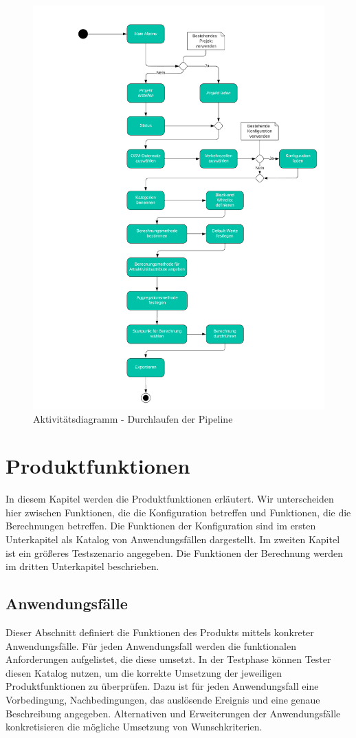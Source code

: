 \documentclass[parskip=full]{scrartcl} %
\begin{document}
\begin{figure}
    \centering
    \includegraphics[width=.9\textwidth,cfbox=black 1pt 0pt]{pictures/Aktivitaetsdiagramm.png}
    \caption{Aktivitätsdiagramm - Durchlaufen der Pipeline}
\end{figure}


\section{Produktfunktionen}
In diesem Kapitel werden die Produktfunktionen erläutert. Wir unterscheiden hier zwischen Funktionen, die die Konfiguration betreffen und Funktionen, die die Berechnungen betreffen. Die Funktionen der Konfiguration sind im ersten Unterkapitel als Katalog von Anwendungsfällen dargestellt. Im zweiten Kapitel ist ein größeres Testszenario angegeben. Die Funktionen der Berechnung werden im dritten Unterkapitel beschrieben.

\subsection{Anwendungsfälle}
Dieser Abschnitt definiert die Funktionen des Produkts mittels konkreter Anwendungsfälle. Für jeden Anwendungsfall werden die funktionalen Anforderungen aufgelistet, die diese umsetzt. In der Testphase können Tester diesen Katalog nutzen, um die korrekte Umsetzung der jeweiligen Produktfunktionen zu überprüfen. Dazu ist für jeden Anwendungsfall eine Vorbedingung, Nachbedingungen, das auslösende Ereignis und eine genaue Beschreibung angegeben. Alternativen und Erweiterungen der Anwendungsfälle konkretisieren die mögliche Umsetzung von Wunschkriterien.
\newpage
\end{document}
